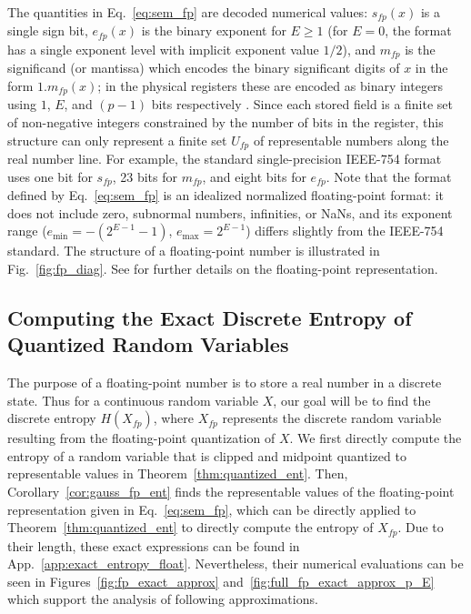 \documentclass[12pt,onecolumn, margin=1in]{IEEEtran}
\newcommand{\Xfp}{X_{fp}}
\begin{document}
The quantities in Eq.~\eqref{eq:sem_fp} are decoded numerical values: $s_{fp}(x)$ is a single sign bit, $e_{fp}(x)$ is the binary exponent for $E \geq 1$ (for $E=0$, the format has a single exponent level with implicit exponent value $1/2$), and $m_{fp}$ is the significand (or mantissa) which encodes the binary significant digits of $x$ in the form $1.m_{fp}(x)$; in the physical registers these are encoded as binary integers using $1$, $E$, and $(p-1)$ bits respectively \cite{muller2010handbookfpn, Goldberg1991_FPN_Intro}. Since each stored field is a finite set of non-negative integers constrained by the number of bits in the register, this structure can only represent a finite set $U_{fp}$ of representable numbers along the real number line. For example, the standard single-precision IEEE-754 format uses one bit for $s_{fp}$, 23 bits for $m_{fp}$, and eight bits for $e_{fp}$. Note that the format defined by Eq.~\eqref{eq:sem_fp} is an idealized normalized floating-point format: it does not include zero, subnormal numbers, infinities, or NaNs, and its exponent range ($e_{\min} = -(2^{E-1}-1)$, $e_{\max} = 2^{E-1}$) differs slightly from the IEEE-754 standard. 
The structure of a floating-point number is illustrated in Fig.~\ref{fig:fp_diag}. See \cite{muller2010handbookfpn, Goldberg1991_FPN_Intro} for further details on the floating-point representation.

\subsection{Computing the Exact Discrete Entropy of Quantized Random Variables}\label{sec:exact_entropy}

The purpose of a floating-point number is to store a real number in a discrete state. Thus for a continuous random variable $X$, our goal will be to find the discrete entropy $H(X_{fp})$, where $X_{fp}$ represents the discrete random variable resulting from the floating-point quantization of $X$. We first directly compute the entropy of a random variable that is clipped and midpoint quantized to representable values in Theorem~\ref{thm:quantized_ent}. Then, Corollary~\ref{cor:gauss_fp_ent} finds the representable values of the floating-point representation given in Eq.~\eqref{eq:sem_fp}, which can be directly applied to Theorem~\ref{thm:quantized_ent} to directly compute the entropy of $\Xfp$. Due to their length, these exact expressions can be found in App.~\ref{app:exact_entropy_float}. Nevertheless, their numerical evaluations can be seen in Figures~\ref{fig:fp_exact_approx} and~\ref{fig:full_fp_exact_approx_p_E} which support the analysis of following approximations.
\end{document}
